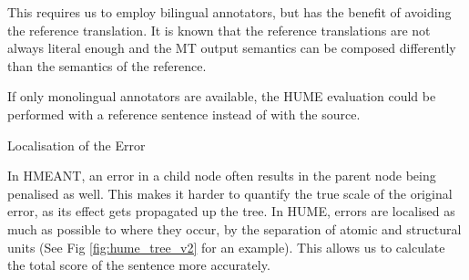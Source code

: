 \documentclass[11pt,letterpaper]{article}
\makeatletter
\renewcommand{\paragraph}{
  \@startsection{paragraph}{4}
  {\z@}{.3ex \@plus .3ex \@minus .2ex}{-1em}
  {\normalfont\normalsize\bfseries}
}
\newcommand{\bh}[1]{}
\def\perscite#1{\newcite{#1}}
\makeatother
\begin{document}
This requires us to employ bilingual annotators, but has the benefit of avoiding
the reference translation. It is known that the reference translations are not
always literal enough and the MT output semantics can be composed differently
than the semantics of the reference. 

If only monolingual annotators are available, the HUME evaluation could be performed
with a reference sentence instead of with the source. 
\bh{But this would be a different metric}


\paragraph{Localisation of the Error}

In HMEANT, an error in a child node often results in the parent node
being penalised as well. This makes it harder to quantify the true scale of  
the original error, as its effect gets propagated up the tree. 
In HUME, errors are localised as much as possible to where they occur,
by the separation of atomic and structural units (See Fig \ref{fig:hume_tree_v2} 
for an example).
This allows us to calculate the total score of the sentence more accurately.



\end{document}

